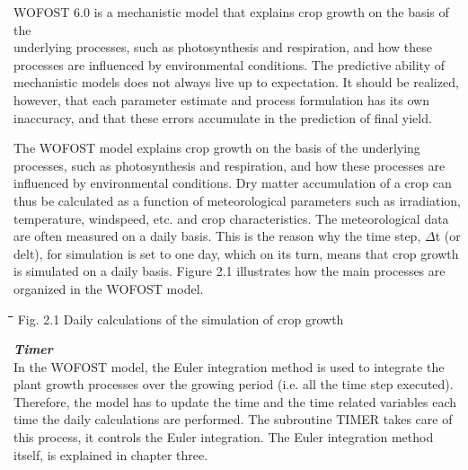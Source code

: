 \bigskip
WOFOST 6.0 is a mechanistic model that explains crop growth on the basis of the \\
underlying processes, such as photosynthesis and respiration, and how these processes are
influenced by environmental conditions. The predictive ability of mechanistic models does
not always live up to expectation. It should be realized, however, that each parame\-ter
estimate and process formulation has its own inaccura\-cy, and that these errors accumulate
in the prediction of final yield.

\bigskip
The WOFOST model explains crop growth on the basis of the underly\-ing processes, such
as photosynthesis and respira\-tion, and how these processes are influenced by environ\-mental conditions. Dry matter accumulation of a crop can thus be calculated as a function
of meteorological parameters such as irradiation, temperature, windspeed, etc. and crop
characteristics. The meteorological data are often measured on a daily basis. This is the
reason why the time step, $\Delta$t (or delt), for simulation is set to one day, which on its turn,
means that crop growth is simulated on a daily basis. Figure 2.1 illustrates how the main
processes are organized in the WOFOST model.\\
\begin{figure}[htbp]
 \begin{center} \end{center}
\end{figure}

\bigskip
\bigskip
\bigskip
\bigskip
\bigskip
\bigskip
\bigskip
\bigskip
\bigskip
\bigskip
\bigskip
\bigskip
\bigskip
\bigskip
\bigskip
\bigskip
\nwln
\begin{tabbing}
\hspace{1.27cm}\=\hspace{1.27cm}\=\hspace{1.27cm}\=\hspace{1.27cm}\=%
\hspace{1.27cm}\=\hspace{1.27cm}\=\hspace{1.27cm}\=\hspace{1.27cm}\=%
\hspace{1.27cm}\=\hspace{1.27cm}\=\kill
Fig. 2.1\> \> Daily calculations of the simulation of crop growth
\end{tabbing}

{\bf {\it Timer\/}}\\
In the WOFOST model, the Euler integration method is used to integrate the plant growth
processes over the growing period (i.e. all the time step executed). Therefore, the model
has to update the time and the time related variables each time the daily calcula\-tions are
performed. The subroutine TIMER takes care of this process, it controls the Euler
integration. The Euler integration method itself, is explained in chapter three.

